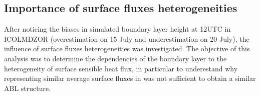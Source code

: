 \clearpage

\subsection{Importance of surface fluxes heterogeneities}
\label{sec:heterogeneities}

After noticing the biases in simulated boundary layer height at 12UTC in ICOLMDZOR (overestimation on 15 July and underestimation on 20 July), the influence of surface fluxes heterogeneities was investigated.
The objective of this analysis was to determine the dependencies of the \mesomean boundary layer to the heterogeneity of surface sensible heat flux, in particular to underestand why representing similar average surface fluxes in \irrboost was not sufficient to obtain a similar ABL structure.


